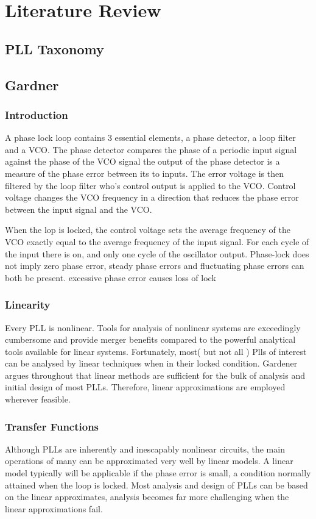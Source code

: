 \chapter{Literature Review}\label{ch:LitReview}

\section{PLL Taxonomy}

\section{Gardner}

\subsection{Introduction}
A phase lock loop contains 3 essential elements, a phase detector, a loop filter and a VCO.
The phase detector compares the phase of a periodic input signal against the phase of the VCO signal the output of the phase detector is a measure of the phase error between its to inputs. The error voltage is then filtered by the loop filter who's control output is applied to the VCO. Control voltage changes the VCO frequency in a direction that reduces the phase error between the input signal and the VCO.

When the lop is locked, the control voltage sets the average frequency of the VCO exactly equal to the average frequency of the input signal. For each cycle of the input there is on, and only one cycle of the oscillator output. Phase-lock does not imply zero phase error, steady phase errors and fluctuating phase errors can both be present. excessive phase error causes loss of lock

\subsection{Linearity}
Every PLL is nonlinear. Tools for analysis of nonlinear systems are exceedingly cumbersome and provide merger benefits compared to the powerful analytical tools available for linear systems. Fortunately, most( but not all ) Plls of interest can be analysed by linear techniques when in their locked condition. Gardener argues throughout that linear methods are sufficient for the bulk of analysis and initial design of most PLLs. Therefore, linear approximations are employed wherever feasible. 

\subsection{Transfer Functions}
Although PLLs are inherently and inescapably nonlinear circuits, the main operations of many can be approximated very well by linear models. A linear model typically will be applicable if the phase error is small, a condition normally attained when the loop is locked. Most analysis and design of PLLs can be based on the linear approximates, analysis becomes far more challenging when the linear approximations fail. 

